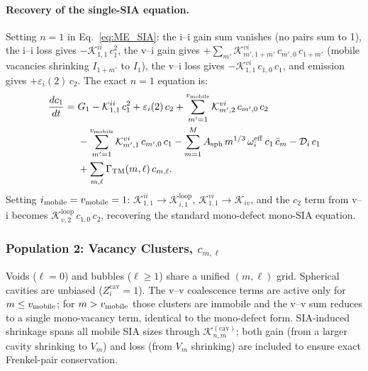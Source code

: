 \documentclass[pdflatex,sn-basic]{sn-jnl} %
\begin{document}
\paragraph{Recovery of the single-SIA equation.}
Setting $n = 1$ in Eq.~\eqref{eq:ME_SIA}: the i--i gain sum vanishes
(no pairs sum to 1), the i--i loss gives $-\mathcal{K}_{1,1}^{ii}\,c_1^2$,
the v--i gain gives
$+\sum_{m'}\mathcal{K}_{m',1+m'}^{vi}\,c_{m',0}\,c_{1+m'}$
(mobile vacancies shrinking $I_{1+m'}$ to $I_1$),
the v--i loss gives $-\mathcal{K}_{1,1}^{vi}\,c_{1,0}\,c_1$,
and emission gives $+\varepsilon_i(2)\,c_2$. The exact $n=1$ equation is:
\begin{equation}\label{eq:ME_I1}
\begin{split}
\frac{dc_1}{dt} = {} &
  G_1
  - \mathcal{K}_{1,1}^{ii}\,c_1^2
  + \varepsilon_i(2)\,c_2
  + \sum_{m'=1}^{v_{\rm mobile}}\mathcal{K}_{m',2}^{vi}\,c_{m',0}\,c_2
  \\
  &- \sum_{m'=1}^{v_{\rm mobile}}\mathcal{K}_{m',1}^{vi}\,c_{m',0}\,c_1
  - \sum_{m=1}^{M}
     A_{\mathrm{sph}}\,m^{1/3}\,\omega_i^{\mathrm{eff}}\,c_1\,\bar{c}_m
  - \mathcal{D}_i\,c_1
  \\
  &+ \sum_{m,\ell}\Gamma_{\mathrm{TM}}(m,\ell)\,c_{m,\ell}.
\end{split}
\end{equation}
Setting $i_{\rm mobile} = v_{\rm mobile} = 1$: $\mathcal{K}_{1,1}^{ii} \to
\mathcal{K}_{i,1}^{\mathrm{loop}}$, $\mathcal{K}_{1,1}^{vi} \to
\mathcal{K}_{iv}$, and the $c_2$ term from v--i becomes
$\mathcal{K}_{v,2}^{\mathrm{loop}}\,c_{1,0}\,c_2$, recovering the
standard mono-defect mono-SIA equation.


\subsubsection{Population 2: Vacancy Clusters, $c_{m,\ell}$}
\label{sec:ME_vac}

Voids ($\ell=0$) and bubbles ($\ell\geq 1$) share a unified $(m,\ell)$
grid. Spherical cavities are unbiased ($Z_i^{\mathrm{cav}} = 1$). The
v--v coalescence terms are active only for $m \leq v_{\rm mobile}$; for
$m > v_{\rm mobile}$ those clusters are immobile and the v--v sum reduces
to a single mono-vacancy term, identical to the mono-defect form.
SIA-induced shrinkage spans all mobile SIA sizes through
$\mathcal{K}_{n,m}^{(\mathrm{cav})}$; both gain (from a larger cavity
shrinking to $V_m$) and loss (from $V_m$ shrinking) are included to
ensure exact Frenkel-pair conservation.
\end{document}
